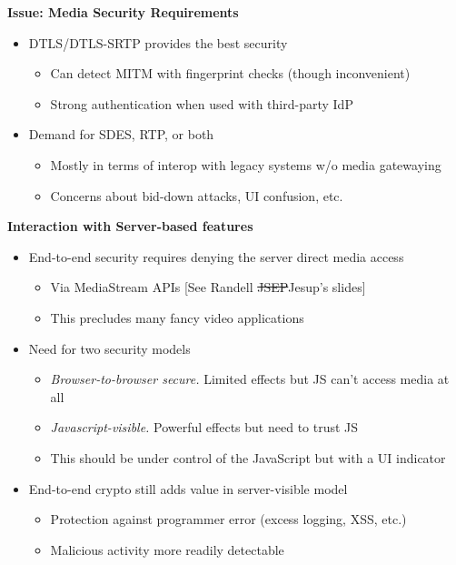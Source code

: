 \documentclass[helvetica]{seminar}
\newcommand{\heading}[1]{%
  \begin{center} 
    \large\bf 
    #1 
  \end{center} 
  \vspace{.4 in}}
\begin{document}
\begin{slide}
\heading{Issue: Media Security Requirements}

\begin{itemize}
\item DTLS/DTLS-SRTP provides the best security
  \begin{itemize}
  \item Can detect MITM with fingerprint checks (though inconvenient)
  \item Strong authentication when used with third-party IdP
  \end{itemize}

\item Demand for SDES, RTP, or both
  \begin{itemize}
  \item Mostly in terms of interop with legacy systems w/o media gatewaying
  \item Concerns about bid-down attacks, UI confusion, etc.
  \end{itemize}
\end{itemize}
\end{slide}



\begin{slide}
\heading{Interaction with Server-based features}

\vspace{-.4in}
\begin{itemize}
\item End-to-end security requires denying the server direct media access
  \begin{itemize}
  \item Via MediaStream APIs [See Randell \sout{JSEP}Jesup's slides]
  \item This precludes many fancy video applications
  \end{itemize}

\item Need for two security models
  \begin{itemize}
  \item[] \emph{Browser-to-browser secure.} Limited effects but JS can't access media at all
  \item[] \emph{Javascript-visible.} Powerful effects but need to trust JS
  \item This should be under control of the JavaScript but with a UI indicator
  \end{itemize}

\item End-to-end crypto still adds value in server-visible model
  \begin{itemize}
  \item Protection against programmer error (excess logging, XSS, etc.)
  \item Malicious activity more readily detectable
  \end{itemize}

\end{itemize}
\end{slide}
\end{document}

